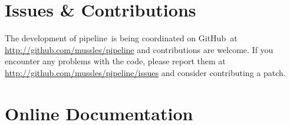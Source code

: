\documentclass[12pt,preprint]{aastex}
\newcommand{\project}[1]{{\sffamily #1}}
\newcommand{\numpy}{\project{numpy}}
\newcommand{\github}{\project{GitHub}}
\newcommand{\thisplain}{pipeline}
\newcommand{\this}{\project{\thisplain}}
\begin{document}

\section{Issues \& Contributions}

The development of \this\ is being coordinated on \github\ at
\url{http://github.com/mussles/pipeline} and contributions are welcome. If you
encounter any problems with the code, please report them at
\url{http://github.com/mussles/pipeline/issues} and consider
contributing a patch.

\section{Online Documentation}

\end{document}
